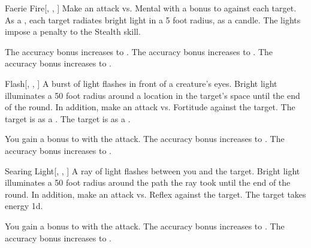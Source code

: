 \lowercase{\hypertarget{spell:Faerie Fire}{}}\label{spell:Faerie Fire}
\begin{freeability}[Rank 1]{\hypertarget{spell:Faerie Fire}{Faerie Fire}}[, , ]
Make an attack vs. Mental with a  bonus to  against each target.
\hit As a , each target radiates bright light in a 5 foot radius, as a candle.
The lights impose a  penalty to the Stealth skill.

\rankline
{} The accuracy bonus increases to .
 The accuracy bonus increases to .
 The accuracy bonus increases to .
\end{freeability}
\vspace{0.25em}



\lowercase{\hypertarget{spell:Flash}{}}\label{spell:Flash}
\begin{freeability}[Rank 1]{\hypertarget{spell:Flash}{Flash}}[, , ]
A burst of light flashes in front of a creature's eyes.
Bright light illuminates a 50 foot radius around a location in the target's space until the end of the round.
In addition, make an attack vs. Fortitude against the target.
\hit The target is  as a .
\crit The target is  as a .

\rankline
{} You gain a  bonus to  with the attack.
 The accuracy bonus increases to .
 The accuracy bonus increases to .
\end{freeability}
\vspace{0.25em}



\lowercase{\hypertarget{spell:Searing Light}{}}\label{spell:Searing Light}
\begin{freeability}[Rank 1]{\hypertarget{spell:Searing Light}{Searing Light}}[, , ]
A ray of light flashes between you and the target.
Bright light illuminates a 50 foot radius around the path the ray took until the end of the round.
In addition, make an attack vs. Reflex against the target.
\hit The target takes energy  \plus1d.

\rankline
{} You gain a  bonus to  with the attack.
 The accuracy bonus increases to .
 The accuracy bonus increases to .
\end{freeability}
\vspace{0.25em}



